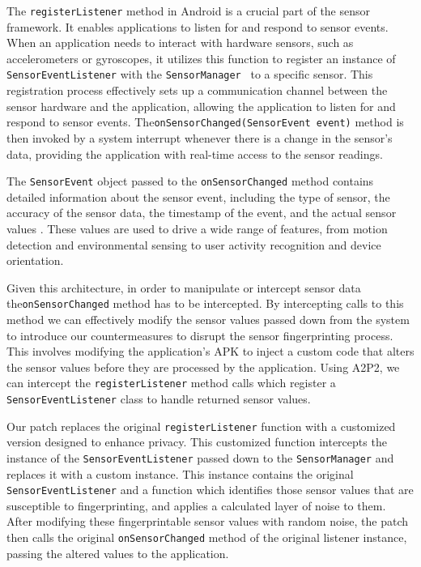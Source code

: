 \documentclass[11pt,
  oneside,openany,    %
]{scrreprt}
\begin{document}
The \verb|registerListener| method in Android is a crucial part of the sensor framework. 
It enables applications to listen for and respond to sensor events.
When an application needs to interact with hardware sensors, such as accelerometers or gyroscopes, it utilizes this function to register an instance of \verb|SensorEventListener| with the \verb|SensorManager|~\cite{android_sensormanager} to a specific sensor.
This registration process effectively sets up a communication channel between the sensor hardware and the application, allowing the application to listen for and respond to sensor events.
The\linebreak\verb|onSensorChanged(SensorEvent event)| method is then invoked by a system interrupt whenever there is a change in the sensor's data, providing the application with real-time access to the sensor readings.

The \verb|SensorEvent| object passed to the \verb|onSensorChanged| method contains detailed information about the sensor event, including the type of sensor, the accuracy of the sensor data, the timestamp of the event, and the actual sensor values \cite{android_sensorevent}.
These values are used to drive a wide range of features, from motion detection and environmental sensing to user activity recognition and device orientation.

Given this architecture, in order to manipulate or intercept sensor data the\linebreak\verb|onSensorChanged| method has to be intercepted.
By intercepting calls to this method we can effectively modify the sensor values passed down from the system to introduce our countermeasures to disrupt the sensor fingerprinting process.
This involves modifying the application's APK to inject a custom code that alters the sensor values before they are processed by the application.
Using A2P2, we can intercept the \verb|registerListener| method calls which register a \verb|SensorEventListener| class to handle returned sensor values.

Our patch replaces the original \verb|registerListener| function with a customized version designed to enhance privacy.
This customized function intercepts the instance of the \verb|SensorEventListener| passed down to the \verb|SensorManager| and replaces it with a custom instance.
This instance contains the original \verb|SensorEventListener| and a function which identifies those sensor values that are susceptible to fingerprinting, and applies a calculated layer of noise to them.
After modifying these fingerprintable sensor values with random noise, the patch then calls the original \verb|onSensorChanged| method of the original listener instance, passing the altered values to the application.
\end{document}
